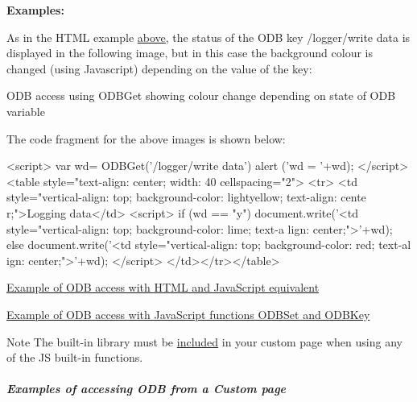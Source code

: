 {\bfseries Examples:} 
\begin{DoxyEnumerate}
\item As in the HTML example \hyperlink{RC_mhttpd_custom_ODB_access_odb_tag_ex1}{above}, the status of the ODB key /logger/write data is displayed in the following image, but in this case the background colour is changed (using Javascript) depending on the value of the key:

\begin{center} ODB access using ODBGet showing colour change depending on state of ODB variable  \par
  \end{center}  \par
 The code fragment for the above images is shown below: 
\begin{DoxyCode}
<script>
var wd= ODBGet('/logger/write data')
alert ('wd = '+wd);
</script>
<table style="text-align: center; width: 40%
cellspacing="2">
<tr>
<td style="vertical-align: top; background-color:  lightyellow; text-align: cente
      r;">Logging data</td>
<script>
if (wd == "y")
   document.write('<td style="vertical-align: top; background-color: lime; text-a
      lign: center;">'+wd);
else
   document.write('<td style="vertical-align: top; background-color: red; text-al
      ign: center;">'+wd);
</script>
</td></tr></table>
\end{DoxyCode}



\item \hyperlink{RC_mhttpd_custom_ODB_access_examples_RC_mhttpd_js_example1}{Example of ODB access with HTML and JavaScript equivalent} 
\item \hyperlink{RC_mhttpd_custom_ODB_access_examples_RC_mhttpd_js_example2}{Example of ODB access with JavaScript functions ODBSet and ODBKey} 
\end{DoxyEnumerate}

\begin{DoxyNote}{Note}
The built-\/in library must be \hyperlink{RC_mhttpd_custom_js_lib_RC_mhttpd_include_js_library}{included} in your custom page when using any of the JS built-\/in functions.
\end{DoxyNote}
\par


\par


\label{RC_mhttpd_custom_ODB_access_idx_ODBGet-JavaScript-function}
\hypertarget{RC_mhttpd_custom_ODB_access_idx_ODBGet-JavaScript-function}{}
 \subparagraph{Examples of accessing ODB from a Custom page}\label{RC_mhttpd_custom_ODB_access_examples}
\par




